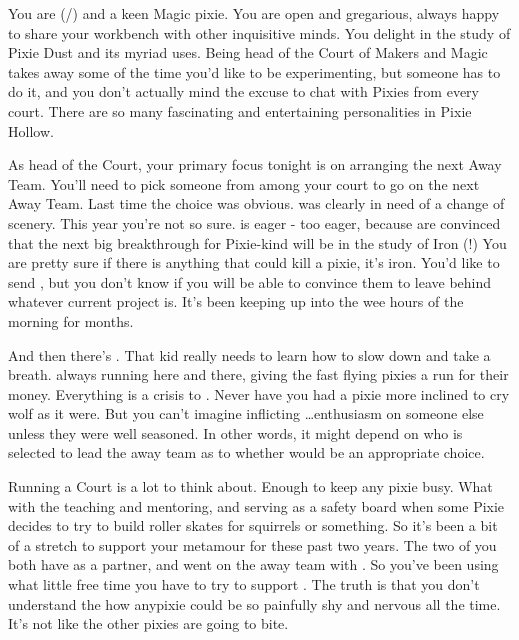 \documentclass[char]{PP}
\begin{document}
\name{\cMHead{}}

You are \cMHead{} (\cMHead{\They}/\cMHead{\Them}) and a keen Magic pixie. You are open and gregarious, always happy to share your workbench with other inquisitive minds. You delight in the study of Pixie Dust and its myriad uses. Being head of the Court of Makers and Magic takes away some of the time you’d like to be experimenting, but someone has to do it, and you don’t actually mind the excuse to chat with Pixies from every court. There are so many fascinating and entertaining personalities in Pixie Hollow.

As head of the Court, your primary focus tonight is on arranging the next Away Team. You’ll need to pick someone from among your court to go on the next Away Team. Last time the choice was obvious. \cMChange{} was clearly in need of a change of scenery. This year you’re not so sure. \cMIron{} is eager - too eager, because \cMIron{\they} are convinced that the next big breakthrough for Pixie-kind will be in the study of Iron (!) You are pretty sure if there is anything that could kill a pixie, it’s iron. You’d like to send \cMAirship{}, but you don’t know if you will be able to convince them to leave behind whatever \cMAirship{\their} current project is. It’s been keeping \cMAirship{\them} up into the wee hours of the morning for months. 

And then there’s \cMTree{}. That kid really needs to learn how to slow down and take a breath. \cMTree{\They} \cMTree{\are} always running here and there, giving the fast flying pixies a run for their money. Everything is a crisis to \cMTree{}. Never have you had a pixie more inclined to cry wolf as it were. But you can’t imagine inflicting \cMTree{\their}\ldots enthusiasm on someone else unless they were well seasoned. In other words, it might depend on who is selected to lead the away team as to whether \cMTree{} would be an appropriate choice.

Running a Court is a lot to think about. Enough to keep any pixie busy. What with the teaching and mentoring, and serving as a safety board when some Pixie decides to try to build roller skates for squirrels or something. So it’s been a bit of a stretch to support your metamour \cFButterfly{} for these past two years. The two of you both have \cFLost{} as a partner, and \cFLost{} went on the away team with \cMChange{}. So you’ve been using what little free time you have to try to support \cFButterfly{}. The truth is that you don’t understand the how anypixie could be so painfully shy and nervous all the time. It’s not like the other pixies are going to bite.
\end{document}
